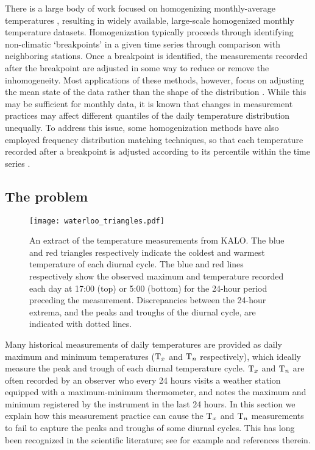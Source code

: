 There is a large body of work focused on homogenizing monthly-average temperatures \citep[e.g.,][]{karl1986model, easterling1996development, peterson1998homogeneity, ducre2003comparison, menne2009homogenization, vincent2012second}, resulting in widely available, large-scale homogenized monthly temperature datasets. 
Homogenization typically proceeds through identifying non-climatic `breakpoints' in a given time series through comparison with neighboring stations.
Once a breakpoint is identified, the measurements recorded after the breakpoint are adjusted in some way to reduce or remove the inhomogeneity.
Most applications of these methods, however, focus on adjusting the mean state of the data rather than the shape of the distribution \citep[see][and references therein]{della2006method}.
While this may be sufficient for monthly data, it is known that changes in measurement practices may affect different quantiles of the daily temperature distribution unequally.
To address this issue, some homogenization methods have also employed frequency distribution matching techniques, so that each temperature recorded after a breakpoint is adjusted according to its percentile within the time series \citep{della2006method, trewin2013daily}. 

\subsection{The problem} 
\label{sec:theproblem}
\label{sec:illustrate_bias}

\begin{figure}[tbp]
\centering
\texttt{[image: waterloo\_triangles.pdf]}
\caption{
\label{fig:waterloo_triangles}
An extract of the temperature measurements from KALO.
The blue and red triangles respectively indicate the coldest and warmest temperature of each diurnal cycle.
The blue and red lines respectively show the observed maximum and temperature recorded each day at 17:00 (top) or 5:00 (bottom) for the 24-hour period preceding the measurement.
Discrepancies between the 24-hour extrema, and the peaks and troughs of the diurnal cycle, are indicated with dotted lines.
}
\end{figure}

Many historical measurements of daily temperatures are provided as daily maximum and minimum temperatures (\(\mathrm{T}_{x}\) and \(\mathrm{T}_{n}\) respectively), which ideally measure the peak and trough of each diurnal temperature cycle. 
\(\mathrm{T}_{x}\) and \(\mathrm{T}_{n}\) are often recorded by an observer who every 24 hours visits a weather station equipped with a maximum-minimum thermometer, and notes the maximum and minimum registered by the instrument in the last 24 hours.
In this section we explain how this measurement practice can cause the \(\mathrm{T}_{x}\) and \(\mathrm{T}_{n}\) measurements to fail to capture the peaks and troughs of some diurnal cycles.
This has long been recognized in the scientific literature; see for example \citet{baker1975effect} and references therein.

